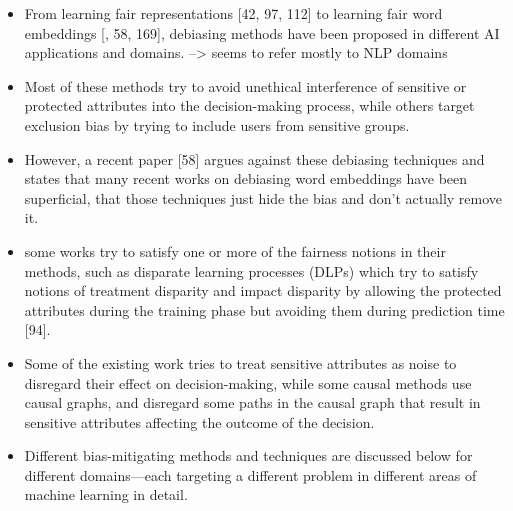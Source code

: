 \documentclass[12pt, a4paper, oneside]{book}   	%
\begin{document}
\begin{itemize}
				
				\item From learning fair representations [42, 97, 112] to learning fair word embeddings [\autocite{M20_Bolukbasi_2016}, 58, 169], debiasing methods have been proposed in different \gls{AI} applications and domains. \autocite{Mehrabi_2021} --> seems to refer mostly to NLP domains
				\item Most of these methods try to avoid unethical interference of sensitive or protected attributes into the decision-making process, while others target exclusion bias by trying to include users from sensitive groups. \autocite{Mehrabi_2021}
				\item However, a recent paper [58] argues against these debiasing techniques and states that many recent works on debiasing word embeddings have been superficial, that those techniques just hide the bias and don’t actually remove it. \autocite{Mehrabi_2021}
				\item some works try to satisfy one or more of the fairness notions in their methods, such as disparate learning processes (DLPs) which try to satisfy notions of treatment disparity and impact disparity by allowing the protected attributes during the training phase but avoiding them during prediction time [94].\autocite{Mehrabi_2021}
				\item Some of the existing work tries to treat sensitive attributes as noise to disregard their effect on decision-making, while some causal methods use causal graphs, and disregard some paths in the causal graph that result in sensitive attributes affecting the outcome of the decision.\autocite{Mehrabi_2021}
				\item Different bias-mitigating methods and techniques are discussed below for different domains—each targeting a different problem in different areas of machine learning in detail. \autocite{Mehrabi_2021}
			\end{itemize}
			
\end{document}
